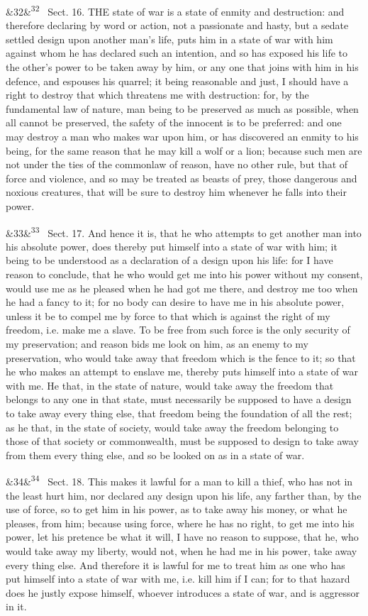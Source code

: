 \documentclass[12pt]{article}
\newcommand{\para}[1][]{\par\noindent\ifx&#1&\else\textsuperscript{\footnotesize #1}~\fi}
\begin{document}
\para[32] Sect. 16. THE state of war is a state of enmity and destruction: and therefore declaring by word or action, not a passionate and hasty, but a sedate settled design upon another man's life, puts him in a state of war with him against whom he has declared such an intention, and so has exposed his life to the other's power to be taken away by him, or any one that joins with him in his defence, and espouses his quarrel; it being reasonable and just, I should have a right to destroy that which threatens me with destruction: for, by the fundamental law of nature, man being to be preserved as much as possible, when all cannot be preserved, the safety of the innocent is to be preferred: and one may destroy a man who makes war upon him, or has discovered an enmity to his being, for the same reason that he may kill a wolf or a lion; because such men are not under the ties of the commonlaw of reason, have no other rule, but that of force and violence, and so may be treated as beasts of prey, those dangerous and noxious creatures, that will be sure to destroy him whenever he falls into their power.

\para[33] Sect. 17. And hence it is, that he who attempts to get another man into his absolute power, does thereby put himself into a state of war with him; it being to be understood as a declaration of a design upon his life: for I have reason to conclude, that he who would get me into his power without my consent, would use me as he pleased when he had got me there, and destroy me too when he had a fancy to it; for no body can desire to have me in his absolute power, unless it be to compel me by force to that which is against the right of my freedom, i.e. make me a slave. To be free from such force is the only security of my preservation; and reason bids me look on him, as an enemy to my preservation, who would take away that freedom which is the fence to it; so that he who makes an attempt to enslave me, thereby puts himself into a state of war with me. He that, in the state of nature, would take away the freedom that belongs to any one in that state, must necessarily be supposed to have a design to take away every thing else, that freedom being the foundation of all the rest; as he that, in the state of society, would take away the freedom belonging to those of that society or commonwealth, must be supposed to design to take away from them every thing else, and so be looked on as in a state of war.

\para[34] Sect. 18. This makes it lawful for a man to kill a thief, who has not in the least hurt him, nor declared any design upon his life, any farther than, by the use of force, so to get him in his power, as to take away his money, or what he pleases, from him; because using force, where he has no right, to get me into his power, let his pretence be what it will, I have no reason to suppose, that he, who would take away my liberty, would not, when he had me in his power, take away every thing else. And therefore it is lawful for me to treat him as one who has put himself into a state of war with me, i.e. kill him if I can; for to that hazard does he justly expose himself, whoever introduces a state of war, and is aggressor in it.
\end{document}
